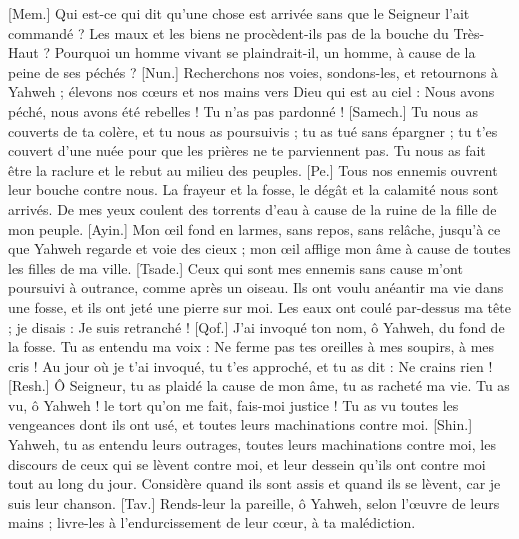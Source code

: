 \begin{multicols}{2}
[Mem.] Qui est-ce qui dit qu'une chose est arrivée sans que le Seigneur l'ait commandé ?
Les maux et les biens ne procèdent-ils pas de la bouche du Très-Haut ?
Pourquoi un homme vivant se plaindrait-il, un homme, à cause de la peine de ses péchés ?
[Nun.] Recherchons nos voies, sondons-les, et retournons à Yahweh ;
élevons nos cœurs et nos mains vers Dieu qui est au ciel :
Nous avons péché, nous avons été rebelles ! Tu n'as pas pardonné !
[Samech.] Tu nous as couverts de ta colère, et tu nous as poursuivis ; tu as tué sans épargner ;
tu t'es couvert d'une nuée pour que les prières ne te parviennent pas.
Tu nous as fait être la raclure et le rebut au milieu des peuples.
[Pe.] Tous nos ennemis ouvrent leur bouche contre nous.
La frayeur et la fosse, le dégât et la calamité nous sont arrivés.
De mes yeux coulent des torrents d'eau à cause de la ruine de la fille de mon peuple.
[Ayin.] Mon œil fond en larmes, sans repos, sans relâche,
jusqu'à ce que Yahweh regarde et voie des cieux ;
mon œil afflige mon âme à cause de toutes les filles de ma ville.
[Tsade.] Ceux qui sont mes ennemis sans cause m'ont poursuivi à outrance, comme après un oiseau.
Ils ont voulu anéantir ma vie dans une fosse, et ils ont jeté une pierre sur moi.
Les eaux ont coulé par-dessus ma tête ; je disais : Je suis retranché !
[Qof.] J'ai invoqué ton nom, ô Yahweh, du fond de la fosse.
Tu as entendu ma voix : Ne ferme pas tes oreilles à mes soupirs, à mes cris !
Au jour où je t'ai invoqué, tu t'es approché, et tu as dit : Ne crains rien !
[Resh.] Ô Seigneur, tu as plaidé la cause de mon âme, tu as racheté ma vie.
Tu as vu, ô Yahweh ! le tort qu'on me fait, fais-moi justice !
Tu as vu toutes les vengeances dont ils ont usé, et toutes leurs machinations contre moi.
[Shin.] Yahweh, tu as entendu leurs outrages, toutes leurs machinations contre moi,
les discours de ceux qui se lèvent contre moi, et leur dessein qu'ils ont contre moi tout au long du jour.
Considère quand ils sont assis et quand ils se lèvent, car je suis leur chanson.
[Tav.] Rends-leur la pareille, ô Yahweh, selon l'œuvre de leurs mains ;
livre-les à l'endurcissement de leur cœur, à ta malédiction.

\end{multicols}

